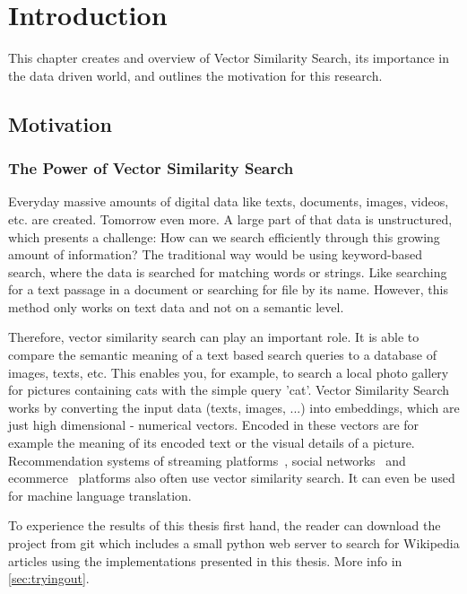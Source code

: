 \chapter{Introduction}
\label{introduction}
This chapter creates and overview of Vector Similarity Search, its importance in the data driven world,
and outlines the motivation for this research.

\section{Motivation}
\subsection{The Power of Vector Similarity Search}
Everyday massive amounts of digital data like texts, documents, images, videos, etc. are created. Tomorrow even more.
A large part of that data is unstructured, which presents a challenge: How can we search efficiently through this growing amount of information?
The traditional way would be using keyword-based search, where the data is searched for matching words or strings. Like searching for a text passage in a document or searching for file by its name.
However, this method only works on text data and not on a semantic level.

Therefore, vector similarity search can play an important role.
It is able to compare the semantic meaning of a text based search queries to a database of images, texts, etc.
This enables you, for example, to search a local photo gallery for pictures containing cats with the simple query 'cat'. Vector Similarity Search works by converting the input data (texts, images, ...) into embeddings,
which are just high dimensional - numerical vectors.
Encoded in these vectors are for example the meaning of its encoded text
or the visual details of a picture.
Recommendation systems of streaming platforms~\cite{6213086}, social networks~\cite{ozsoy2016wordembeddingsitemrecommendation} and ecommerce~\cite{8821893} platforms also often use vector similarity search. It can even be used for machine language translation.~\cite{mikolov2013exploitingsimilaritieslanguagesmachine}

To experience the results of this thesis first hand, the reader can download the project from git which includes a small python web server to search for Wikipedia articles using the implementations presented in this thesis. More info in \autoref{sec:tryingout}.

